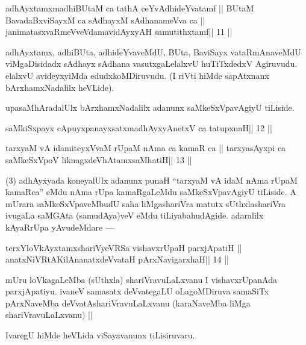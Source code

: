 
\begin{shl}
adhAyxtamxmadhiBUtaM ca tathA ceYvAdhideYvatamf ||
BUtaM BavadaBxviSayxM ca sAdhayxM sAdhanameVva ca ||
janimatasxvaRmeVveVdamavidAyxyAH samutithxtamf\hfill || 11 ||
\end{shl}

\begin{artha}
adhAyxtamx, adhiBUta, adhideYvaveMdU, BUta, BaviSayx vataRmAnaveMdU 
viMgaDisidadx sAdhayx sAdhana vasutxgaLelalxvU huTiTxdedxV Agiruvudu. elalxvU avideyxyiMda edudxkoMDiruvudu. (I riVti hiMde sapAtxnanx bArxhamxNadalilx heVLide).
\end{artha} 
 
\begin{artha}
upasaMhAradalUlx bArxhamxNadalilx adanunx saMkeSxVpavAgiyU tiLiside.
\end{artha}

\begin{shl}
saMkiSxpayx cApuyxpanayxsatxmadhAyxyAnetxV ca tatupxnaH\hfill || 12 ||
\end{shl}

\begin{shl}
tarxyaM vA idamiteyxVvaM rUpaM nAma ca kamaR ca ||
tarxyasAyxpi ca saMkeSxVpoV liknagxdeVhAtamxsaMhatiH\hfill || 13 ||
\end{shl}

\begin{artha}
(3) adhAyxyada koneyalUlx adanunx punaH ``tarxyaM vA idaM nAma rUpaM 
kamaRca'' eMdu nAma rUpa kamaRgaLeMdu saMkeSxVpavAgiyU tiLiside. A mUrara saMkeSxVpaveMbudU saha liMgashariVra matutx sUthxlashariVra ivugaLa saMGAta (samudAya)veV eMdu tiLiyabahudAgide. adaralilx kAyaRrUpa yAvudeMdare ---
\end{artha}

\begin{shl}
terxYloVkAyxtamxshariVyeVRSa vishavxrUpaH parxjApatiH ||
anatxNiVRtAKilAnanatxdeVvataH pArxNavigarxhaH\hfill || 14 ||
\end{shl}

\begin{artha}
mUru loVkagaLeMba (sUthxla) shariVravuLaLxvanu I vishavxrUpanAda 
parxjApatiyu. ivaneV samasatx deVvategaLU oLagoMDiruva samaSiTx pArxNaveMba deVvatAshariVravuLaLxvanu (karaNaveMba liMga shariVravuLaLxvanu) ||
\end{artha} 
 
\begin{artha}
IvaregU hiMde heVLida viSayavanunx tiLisiruvaru.
\end{artha} 
 
